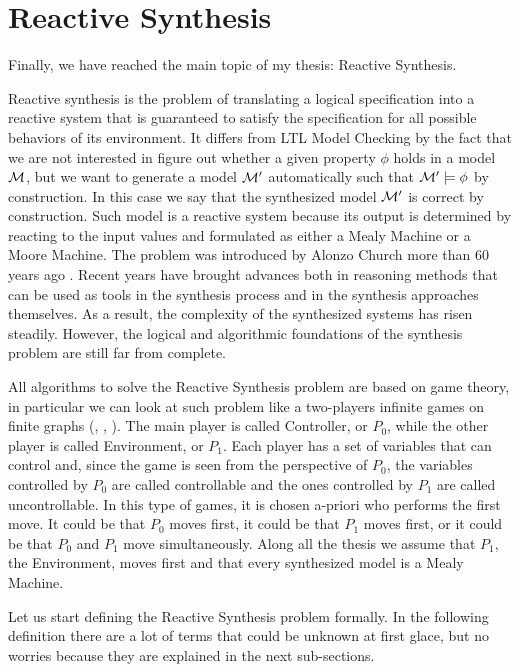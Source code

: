 
\section{Reactive Synthesis}
\label{sec:reactive-synthesis}

Finally, we have reached the main topic of my thesis: Reactive Synthesis.

Reactive synthesis is the problem of translating a logical specification into a reactive system that is guaranteed to satisfy the specification for all possible behaviors of its environment. 
It differs from LTL Model Checking by the fact that we are not interested in figure out whether a given property $\phi$ holds in a model $\mathcal{M}$, but we want to generate a model $\mathcal{M}'$ automatically such that $\mathcal{M}' \models \phi$ by construction. 
In this case we say that the synthesized model $\mathcal{M}'$ is correct by construction.
Such model is a reactive system because its output is determined by reacting to the input values and formulated as either a Mealy Machine or a Moore Machine. 
The problem was introduced by Alonzo Church more than $60$ years ago \cite{C64}. 
Recent years have brought advances both in reasoning methods that can be used as tools in the synthesis process and in the synthesis approaches themselves.
As a result, the complexity of the synthesized systems has risen steadily. 
However, the logical and algorithmic foundations of the synthesis problem are still far from complete.

All algorithms to solve the Reactive Synthesis problem are based on game theory, in particular we can look at such problem like a two-players infinite games on finite graphs (\cite{R68}, \cite{W95}, \cite{BL90}). 
The main player is called Controller, or $P_0$, while the other player is called Environment, or $P_1$. 
Each player has a set of variables that can control and, since the game is seen from the perspective of $P_0$, the variables controlled by $P_0$ are called controllable and the ones controlled by $P_1$ are called uncontrollable.
In this type of games, it is chosen a-priori who performs the first move. 
It could be that $P_0$ moves first, it could be that $P_1$ moves first, or it could be that $P_0$ and $P_1$ move simultaneously. 
Along all the thesis we assume that $P_1$, the Environment, moves first and that every synthesized model is a Mealy Machine.

Let us start defining the Reactive Synthesis problem formally. 
In the following definition there are a lot of terms that could be unknown at first glace, but no worries because they are explained in the next sub-sections.

